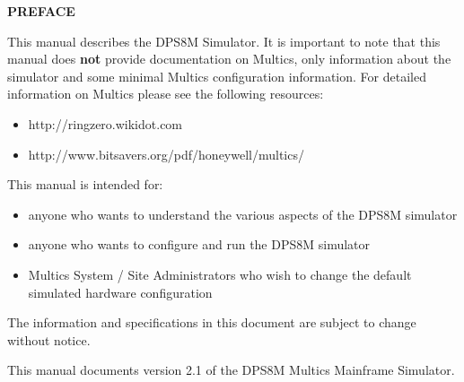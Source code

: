 \begin{center}
\Large\bfseries PREFACE
\end{center}

This manual describes the DPS8M Simulator. It is important to note that this manual 
does \textbf{not} provide documentation on Multics, only information about the simulator and some minimal Multics configuration information.
For detailed information on Multics please see the following resources:

\begin{itemize}
	\item http://ringzero.wikidot.com
	\item http://www.bitsavers.org/pdf/honeywell/multics/
\end{itemize} 

This manual is intended for:

\begin{itemize}
	\item anyone who wants to understand the various aspects of the DPS8M simulator
	\item anyone who wants to configure and run the DPS8M simulator
	\item Multics System / Site Administrators who wish to change the default simulated hardware configuration
\end{itemize} 

The information and specifications in this document are subject to change without notice.

This manual documents version 2.1 of the DPS8M Multics Mainframe Simulator.

